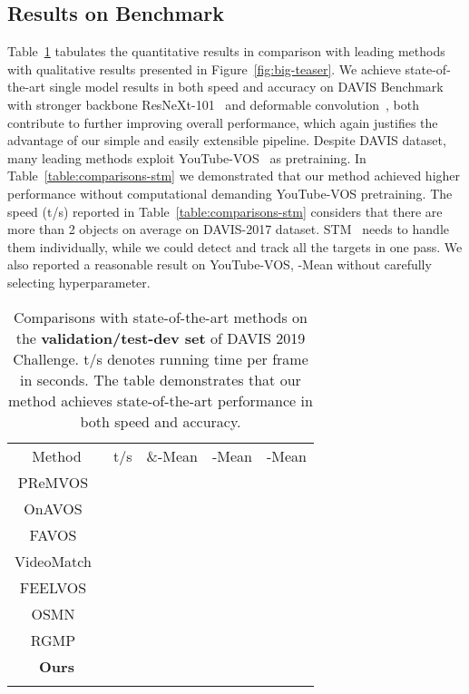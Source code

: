 \documentclass[10pt,twocolumn,letterpaper]{article}
\begin{document}
\subsection{Results on Benchmark}
\vspace{-0.5em}
Table~\ref{table:comparisons-stoa} tabulates the quantitative results in comparison with  leading methods with qualitative results presented in Figure~\ref{fig:big-teaser}.
We achieve state-of-the-art single model results in both speed and accuracy on DAVIS Benchmark with stronger backbone ResNeXt-101~\cite{xie2017resnext} and deformable convolution~\cite{dai2017deformable},
both contribute to further improving  overall performance, which again justifies the advantage of our simple and easily extensible pipeline.
Despite DAVIS dataset, many leading methods exploit YouTube-VOS~\cite{xu2018youtube} as pretraining. In Table~\ref{table:comparisons-stm} we demonstrated that our method achieved higher performance without computational demanding YouTube-VOS pretraining. The speed (t/s) reported in Table~\ref{table:comparisons-stm} considers that there are more than 2 objects on average on DAVIS-2017 dataset. STM~\cite{oh2019stm} needs to handle them individually, while we could detect and track all the targets in one pass. We also reported a reasonable result on YouTube-VOS,  -Mean without carefully selecting hyperparameter. 
\begin{table}
\small
\centering
\addtolength{\tabcolsep}{-3.5pt}
\begin{tabular}{c|c|ccc}
\Xhline{1.0pt}
Method & t/s & \&-Mean & -Mean & -Mean \\
\Xhline{1.0pt}
PReMVOS~\cite{luiten2018premvos} &&&& \\
OnAVOS~\cite{voigtlaender2017online}  &&&& \\
FAVOS~\cite{cheng2018favos}  &&&& \\
VideoMatch~\cite{hu2018videomatch} &&&& \\
FEELVOS~\cite{voigtlaender2019feelvos} &&&& \\
OSMN~\cite{yang2018efficient} &&&& \\
RGMP~\cite{wug2018fast}    &&&& \\
\hline
\textbf{Ours} &&&&\\
\Xhline{1.0pt}
\end{tabular}
\caption{Comparisons with state-of-the-art methods on the \textbf{validation/test-dev set} of DAVIS 2019 Challenge. t/s denotes running time per frame in seconds.
The table demonstrates that our method achieves state-of-the-art performance in both speed and accuracy.}
\label{table:comparisons-stoa}
\vspace{-0.2in}
\end{table}
\end{document}
